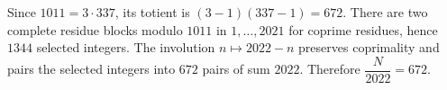 Since $1011=3\cdot337$, its totient is $(3-1)(337-1)=672$. There are two complete residue blocks modulo $1011$ in $1,\ldots,2021$ for coprime residues, hence $1344$ selected integers. The involution $n\mapsto2022-n$ preserves coprimality and pairs the selected integers into $672$ pairs of sum $2022$. Therefore $\boxed{\dfrac{N}{2022}=672}$.
